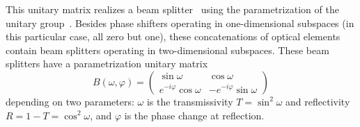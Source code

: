 \documentclass[%
 reprint,
 superscriptaddress,
 showpacs,
 showkeys,
 nofootinbib,
  amsmath,amssymb,
 pra,
  longbibliography,
  floatfix,
 ]{revtex4-2}
\theoremstyle{definition}
\begin{document}
This unitary matrix realizes  a beam splitter~\cite{reck-94,rzbb,%
de_Guise_2018}
using the parametrization of the unitary group~\cite{murnaghan}.
Besides phase shifters operating in one-dimensional subspaces (in this particular case, all zero but one),
these concatenations of optical elements
contain beam splitters operating in two-dimensional subspaces.
These beam splitters have a parametrization unitary matrix
\begin{equation*}
B( \omega , \varphi )  =
\begin{pmatrix}
 \sin  \omega  & \cos  \omega
\\
e^{-i \varphi } \cos  \omega  &-e^{-i \varphi } \sin  \omega
\end{pmatrix}
\end{equation*}
depending on two parameters:
 $\omega$ is the transmissivity $T=\sin^2\omega$ and reflectivity $R=1-T=\cos^2\omega$,
and $\varphi$ is the phase change at reflection.
\end{document}
